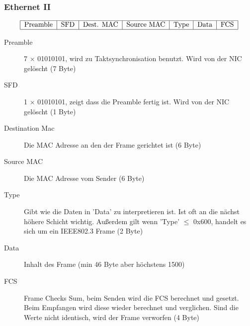 \documentclass[a4paper,10pt]{scrartcl}
\begin{document}
        \subsubsection{Ethernet II}
            \[
                \begin{tabular}{|c|c|c|c|c|c|c|}
                    \hline
                        Preamble & SFD & Dest. MAC & Source MAC & Type & Data & FCS \\
                    \hline
                \end{tabular}
            \]

            \begin{description}
                \item[Preamble] 7 $\times$ 01010101, wird zu Taktsynchronisation benutzt. Wird von der NIC gelöscht (7 Byte)
                \item[SFD] 1 $\times$ 01010101, zeigt dass die Preamble fertig ist. Wird von der NIC gelöscht (1 Byte)
                \item[Destination Mac] Die MAC Adresse an den der Frame gerichtet ist (6 Byte) 
                \item[Source MAC] Die MAC Adresse vom Sender (6 Byte)
                \item[Type] Gibt wie die Daten in 'Data' zu interpretieren ist. Ist oft an die nächst höhere Schicht wichtig. 
                Außerdem gilt wenn 'Type' $\leq$ 0x600, handelt es sich um ein IEEE802.3 Frame (2 Byte)
                \item[Data] Inhalt des Frame (min 46 Byte aber höchstens 1500)
                \item[FCS] Frame Checks Sum, beim Senden wird die FCS berechnet und gesetzt. Beim Empfangen wird diese wieder berechnet und verglichen. Sind die Werte nicht identisch, wird der Frame verworfen (4 Byte) 
            \end{description}
        
\end{document}
